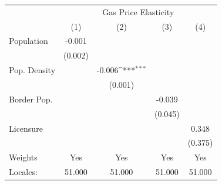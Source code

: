 {
\def\sym#1{\ifmmode^{#1}\else\(^{#1}\)\fi}
\begin{tabular}{l*{4}{c}}
\hline\hline
            &\multicolumn{4}{c}{Gas Price Elasticity}                                               \\
            &\multicolumn{1}{c}{(1)}         &\multicolumn{1}{c}{(2)}         &\multicolumn{1}{c}{(3)}         &\multicolumn{1}{c}{(4)}         \\
\hline
Population  &      -0.001         &                     &                     &                     \\
            &     (0.002)         &                     &                     &                     \\
[1em]
Pop. Density&                     &      -0.006\sym{***}&                     &                     \\
            &                     &     (0.001)         &                     &                     \\
[1em]
Border Pop. &                     &                     &      -0.039         &                     \\
            &                     &                     &     (0.045)         &                     \\
[1em]
Licensure   &                     &                     &                     &       0.348         \\
            &                     &                     &                     &     (0.375)         \\
\hline
Weights     &         Yes         &         Yes         &         Yes         &         Yes         \\
Locales:    &      51.000         &      51.000         &      51.000         &      51.000         \\
\hline\hline
\end{tabular}
}
